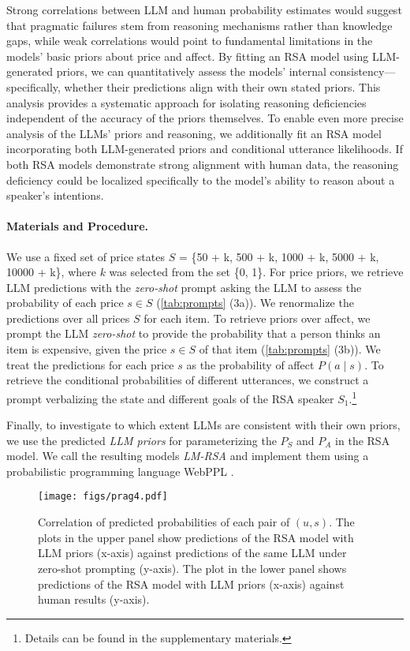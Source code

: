 Strong correlations between LLM and human probability estimates would suggest that pragmatic failures stem from reasoning mechanisms rather than knowledge gaps, while weak correlations would point to fundamental limitations in the models' basic priors about price and affect. By fitting an RSA model using LLM-generated priors, we can quantitatively assess the models' internal consistency—specifically, whether their predictions align with their own stated priors. This analysis provides a systematic approach for isolating reasoning deficiencies independent of the accuracy of the priors themselves. To enable even more precise analysis of the LLMs' priors and reasoning, we additionally fit an RSA model incorporating both LLM-generated priors and conditional utterance likelihoods. If both RSA models demonstrate strong alignment with human data, the reasoning deficiency could be localized specifically to the model's ability to reason about a speaker's intentions.

\paragraph{Materials and Procedure.} 
We use a fixed set of price states $S$ = \{50 + k, 500 + k, 1000 + k, 5000 + k, 10000 + k\}, where $k$ was  selected from the set \{0, 1\}. 
For price priors, we retrieve LLM predictions with the \textit{zero-shot} prompt asking the LLM to assess the probability of each price $s \in S$ (\autoref{tab:prompts} (3a)). We renormalize the predictions over all prices $S$ for each item. 
To retrieve priors over affect, we prompt the LLM \textit{zero-shot} to provide the probability that a person thinks an item is expensive, given the price $s\in S$ of that item (\autoref{tab:prompts} (3b)). We treat the predictions for each price $s$ as the probability of affect $P(a \mid s)$. 
To retrieve the conditional probabilities of different utterances, we construct a prompt verbalizing the state and different goals of the RSA speaker $S_1$.\footnote{Details can be found in the supplementary materials.}  

Finally, to investigate to which extent LLMs are consistent with their own priors, we use the predicted \textit{LLM priors} for parameterizing the $P_{S}$ and $P_A$ in the RSA model.
We call the resulting models \textit{LM-RSA} and implement them using a probabilistic programming language WebPPL \citep{dippl}. 
\begin{figure*}[tbp]
    \centering
    \texttt{[image: figs/prag4.pdf]} 
    \caption{Correlation of predicted probabilities of each pair of $(u, s)$. The plots in the upper panel show predictions of the RSA model with LLM priors (x-axis) against predictions of the same LLM under zero-shot prompting (y-axis). The plot in the lower panel shows predictions of the RSA model with LLM priors (x-axis) against human results (y-axis).}
    \label{fig:lm-rsa-claude-gemini}
\end{figure*}

